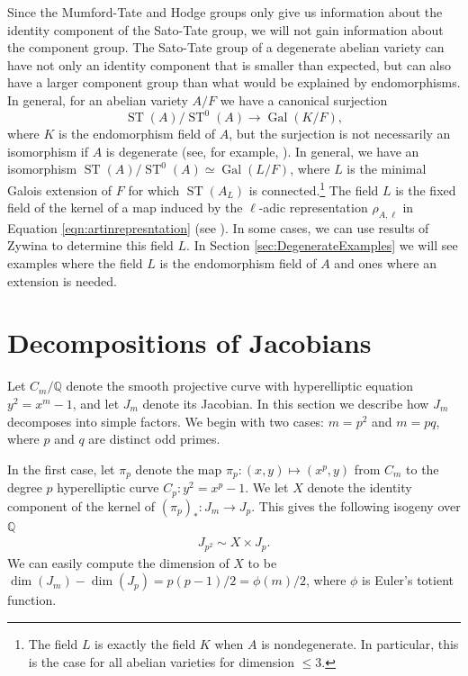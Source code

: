 \documentclass[reqno, oneside, 12pt]{amsart}
\DeclareMathOperator{\ST}{ST}
\DeclareMathOperator{\Gal}{Gal}
\newcommand{\Q}{\mathbb{Q}}
\theoremstyle{remark}
\numberwithin{equation}{section}
\begin{document}
Since the Mumford-Tate and Hodge groups only give us information about the identity component of the Sato-Tate group, we will not gain information about the component group. The Sato-Tate group of a degenerate abelian variety  can have not only an identity component that is  smaller than expected, but can also have a larger component group than what would be explained by endomorphisms. In general, for an abelian variety $A/F$ we have a canonical surjection
$$\ST(A)/\ST^0(A) \rightarrow \Gal(K/F),$$
where $K$ is the endomorphism field of $A$, but the surjection is not necessarily an isomorphism if $A$ is degenerate (see, for example, \cite{SutherlandGenus3}).  In general, we have an isomorphism $\ST(A)/\ST^0(A) \simeq \Gal(L/F)$, where $L$ is the minimal Galois extension of $F$ for which $\ST(A_L)$ is connected.\footnote{The field $L$ is exactly the field $K$ when $A$ is nondegenerate. In particular, this is the case for all abelian varieties for dimension $\leq 3$.} The field $L$ is the fixed field of the kernel of a map induced by the $\ell$-adic representation $\rho_{A,\ell}$  in Equation \eqref{eqn:artinrepresntation} (see \cite[Theorem 3.12]{SutherlandNotes}). %
In some cases, we can use results of Zywina \cite{zywina2020determining} to determine this field $L$. In Section \ref{sec:DegenerateExamples} we will see examples where the field $L$ is the endomorphism field of $A$ and ones where an extension is needed.












\section{Decompositions of Jacobians}\label{sec:JacobianSplitting}

Let $C_m/\Q$ denote the smooth projective curve with hyperelliptic equation $y^2=x^m-1$, and let $J_m$ denote its Jacobian. In this section we describe how $J_m$ decomposes into simple factors. We begin with two cases: $m=p^2$ and $m=pq$, where $p$ and $q$ are distinct odd primes.
 

In the first case, let $\pi_p$ denote the map $\pi_p: (x,y)\mapsto (x^{p},y)$ from $C_m$ to the degree $p$ hyperelliptic curve $C_p\colon y^2=x^p-1$. We let $X$ denote the identity component of the kernel of $(\pi_p)_*\colon J_m \to J_p$. This gives the following isogeny over $\Q$
\begin{align}\label{eqn:Jpp_splitting}
    J_{p^2}\sim X\times J_p.
\end{align}
We can easily compute the dimension of $X$ to be $\dim(J_m)-\dim(J_p)=p(p-1)/2=\phi(m)/2$, where $\phi$ is Euler's totient function.
\end{document}
